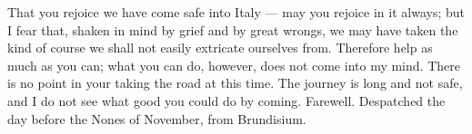 

 That you rejoice we have come safe into Italy --- may you rejoice in it always; but I fear that, shaken in mind by grief and by great wrongs, we may have taken the kind of course we shall not easily extricate ourselves from. Therefore help as much as you can; what you can do, however, does not come into my mind. There is no point in your taking the road at this time. The journey is long and not safe, and I do not see what good you could do by coming. Farewell. Despatched the day before the Nones of November, from Brundisium.
